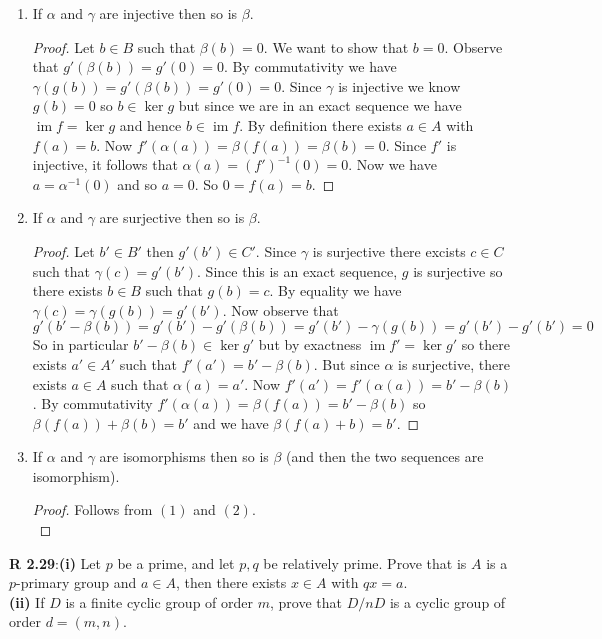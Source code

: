 \documentclass[8pt]{amsart}
\theoremstyle{plain}%
\theoremstyle{definition}
\theoremstyle{remark}
\numberwithin{equation}{section}
\newcommand{\im}{\operatorname{im}}
\begin{document}
	\begin{enumerate}
		\item If $\alpha$ and $\gamma$ are injective then so is $\beta$.
			\begin{proof}
				Let $b \in B$ such that $\beta(b) = 0$. We want to show that $b = 0$. Observe that $g'(\beta(b)) = g'(0) = 0$. By commutativity we have $\gamma(g(b)) = g'(\beta(b)) = g'(0) = 0$. Since $\gamma$ is injective we know $g(b) = 0$ so $b \in \ker g$ but since we are in an exact sequence we have $\im f = \ker g$ and hence $b \in \im f$. By definition there exists $a \in A$ with $f(a) = b$. Now $f'(\alpha(a)) = \beta(f(a)) = \beta(b) = 0$. Since $f'$ is injective, it follows that $\alpha(a) = (f')^{-1}(0) = 0$. Now we have $a = \alpha^{-1}(0)$ and so $a = 0$. So $0 = f(a) = b$.
			\end{proof}
		\item If $\alpha$ and $\gamma$ are surjective then so is $\beta$.
			\begin{proof}
				Let $b' \in B'$ then $g'(b') \in C'$. Since $\gamma$ is surjective there excists $c \in C$ such that $\gamma(c) = g'(b')$. Since this is an exact sequence, $g$ is surjective so there exists $b \in B$ such that $g(b) = c$. By equality we have $\gamma(c) = \gamma(g(b)) = g'(b')$. Now observe that $$g'(b' - \beta(b)) = g'(b') - g'(\beta(b)) = g'(b') - \gamma(g(b)) = g'(b') - g'(b') = 0$$ So in particular $b' - \beta(b) \in \ker g'$ but by exactness $\im f' = \ker g'$ so there exists $a' \in A'$ such that $f'(a') = b' - \beta(b)$. But since $\alpha$ is surjective, there exists $a \in A$ such that $\alpha(a) = a'$. Now $f'(a') = f'(\alpha(a)) = b' - \beta(b)$. By commutativity $f'(\alpha(a)) = \beta(f(a)) = b' - \beta(b)$ so $\beta(f(a)) + \beta(b) = b'$ and we have $\beta(f(a) + b) = b'$.
			\end{proof}
		\item If $\alpha$ and $\gamma$ are isomorphisms then so is $\beta$ (and then the two sequences are isomorphism).
			\begin{proof}
				Follows from $(1)$ and $(2)$.\\
			\end{proof}
	\end{enumerate}

\textbf{R 2.29}:\textbf{(i)} Let $p$ be a prime, and let $p,q$ be relatively prime. Prove that is $A$ is a $p$-primary group and $a \in A$, then there exists $x \in A$ with $qx=a$. \\

\indent \textbf{(ii)} If $D$ is a finite cyclic group of order $m$, prove that $D/nD$ is a cyclic group of order $d=(m,n)$. \\
\end{document}

